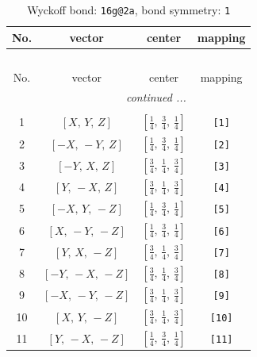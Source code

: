 \documentclass[fleqn,8pt]{jsarticle}
\begin{document}
\begin{longtable}{cccc}
\caption{Wyckoff bond: {\tt 16g@2a}, bond symmetry: {\tt 1}}
 \\
 \hline \hline
No. & vector & center & mapping \\ \hline \endfirsthead

\multicolumn{3}{l}{\tablename\ \thetable{}} \\
 \hline \hline
No. & vector & center & mapping \\ \hline \endhead

 \hline \hline
\multicolumn{3}{r}{\footnotesize\it continued ...} \\ \endfoot

 \hline \hline
\multicolumn{3}{r}{} \\ \endlastfoot

1 & $\left[ X,\, Y,\, Z \right]$ & $\left[ \frac{1}{4},\, \frac{3}{4},\, \frac{1}{4} \right]$ & {\tt [1]} \\ \hline
2 & $\left[ - X,\, - Y,\, Z \right]$ & $\left[ \frac{1}{4},\, \frac{3}{4},\, \frac{1}{4} \right]$ & {\tt [2]} \\ \hline
3 & $\left[ - Y,\, X,\, Z \right]$ & $\left[ \frac{3}{4},\, \frac{1}{4},\, \frac{3}{4} \right]$ & {\tt [3]} \\ \hline
4 & $\left[ Y,\, - X,\, Z \right]$ & $\left[ \frac{3}{4},\, \frac{1}{4},\, \frac{3}{4} \right]$ & {\tt [4]} \\ \hline
5 & $\left[ - X,\, Y,\, - Z \right]$ & $\left[ \frac{1}{4},\, \frac{3}{4},\, \frac{1}{4} \right]$ & {\tt [5]} \\ \hline
6 & $\left[ X,\, - Y,\, - Z \right]$ & $\left[ \frac{1}{4},\, \frac{3}{4},\, \frac{1}{4} \right]$ & {\tt [6]} \\ \hline
7 & $\left[ Y,\, X,\, - Z \right]$ & $\left[ \frac{3}{4},\, \frac{1}{4},\, \frac{3}{4} \right]$ & {\tt [7]} \\ \hline
8 & $\left[ - Y,\, - X,\, - Z \right]$ & $\left[ \frac{3}{4},\, \frac{1}{4},\, \frac{3}{4} \right]$ & {\tt [8]} \\ \hline
9 & $\left[ - X,\, - Y,\, - Z \right]$ & $\left[ \frac{3}{4},\, \frac{1}{4},\, \frac{3}{4} \right]$ & {\tt [9]} \\ \hline
10 & $\left[ X,\, Y,\, - Z \right]$ & $\left[ \frac{3}{4},\, \frac{1}{4},\, \frac{3}{4} \right]$ & {\tt [10]} \\ \hline
11 & $\left[ Y,\, - X,\, - Z \right]$ & $\left[ \frac{1}{4},\, \frac{3}{4},\, \frac{1}{4} \right]$ & {\tt [11]} \\ \hline

\end{longtable}
\end{document}
